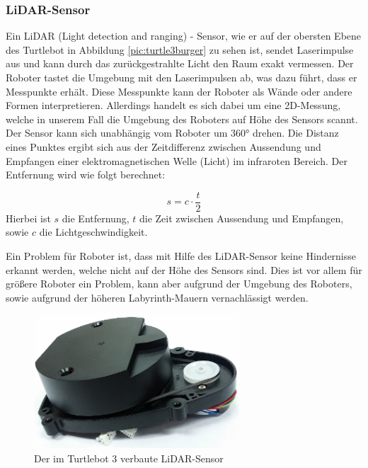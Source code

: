 {{		\subsubsection{LiDAR-Sensor}
		{
			Ein LiDAR (Light detection and ranging) - Sensor, wie er auf der obersten Ebene des Turtlebot in Abbildung \ref{pic:turtle3burger} zu sehen ist, sendet Laserimpulse aus und kann durch das zurückgestrahlte Licht den Raum exakt vermessen. Der Roboter tastet die Umgebung mit den Laserimpulsen ab, was dazu führt, dass er Messpunkte erhält. Diese Messpunkte kann der Roboter als Wände oder andere Formen interpretieren. Allerdings handelt es sich dabei um eine 2D-Messung, welche in unserem Fall die Umgebung des Roboters auf Höhe des Sensors scannt. Der Sensor kann sich unabhängig vom Roboter um 360° drehen. 
			Die Distanz eines Punktes ergibt sich aus der Zeitdifferenz zwischen Aussendung und Empfangen einer elektromagnetischen Welle (Licht) im infraroten Bereich.
			Der Entfernung wird wie folgt berechnet:
			
			\begin{equation}
				s = c \cdot \frac{t}{2}
			\end{equation} 
			Hierbei ist $s$ die Entfernung, $t$ die Zeit zwischen Aussendung und Empfangen, sowie $c$ die Lichtgeschwindigkeit.
			
			Ein Problem für Roboter ist, dass mit Hilfe des LiDAR-Sensor keine Hindernisse erkannt werden, welche nicht auf der Höhe des Sensors sind. Dies ist vor allem für größere Roboter ein Problem, kann aber aufgrund der Umgebung des Roboters, sowie aufgrund der höheren Labyrinth-Mauern vernachlässigt werden. \parencite{LiDAR}
			\begin{figure}[H]
				\centering
				\includegraphics[height=5cm]{Bilder/lds_small.png}
				\caption{Der im Turtlebot 3 verbaute LiDAR-Sensor}
				\label{pic:lds_small}
			\end{figure}
		}
		
}}
